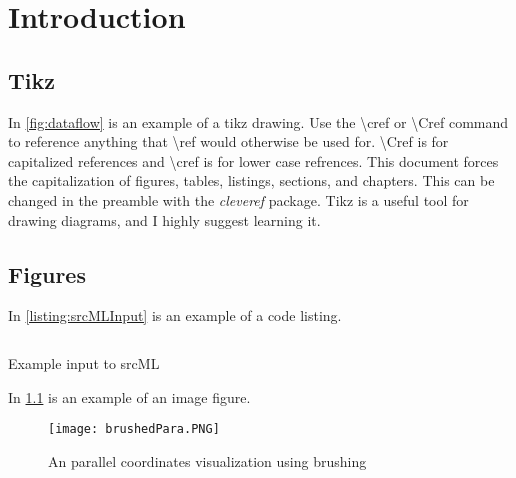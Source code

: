 \chapter{Introduction} \label{ch:intro}

\blindtext

\section{Tikz}

In \cref{fig:dataflow} is an example of a tikz drawing. Use the \textbackslash cref or \textbackslash Cref command to reference anything that \textbackslash ref would otherwise be used for. \textbackslash Cref is for capitalized references and \textbackslash cref is for lower case refrences.  This document forces the capitalization of figures, tables, listings, sections, and chapters.  This can be changed in the preamble with the \textit{cleveref} package. Tikz is a useful tool for drawing diagrams, and I highly suggest learning it.





\section{Figures}

In \cref{listing:srcMLInput} is an example of a code listing.

\begin{listing}
		\vspace{\baselineskip}
			{\small
			\inputminted{cpp}{supportingDocs/radius-func-cpp.tex}
			}
            \caption{Example input to srcML}
            \label{listing:srcMLInput}
  		\vspace{\baselineskip}
\end{listing}

In \cref{fig:brushedPara} is an example of an image figure. 

\begin{figure}[ht]
    \centering
    \texttt{[image: brushedPara.PNG]}
    \caption{An parallel coordinates visualization using    brushing\cite{paracoord}}
    \label{fig:brushedPara}
\end{figure}

\blindtext